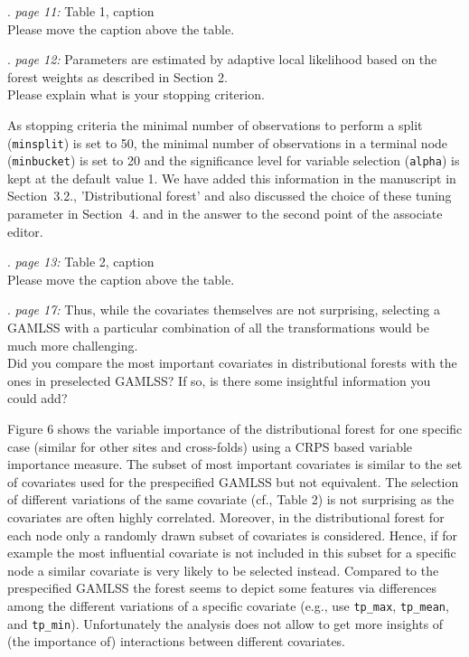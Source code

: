 \documentclass[american,foldmarks=false,noconfig]{uibklttr}
\let\code=\texttt
\newenvironment{review}{\fontshape{\itdefault}\fontseries{\bfdefault} \selectfont \smallskip}{\par}
\begin{document}
\begin{review}
12. {\color{quotecolor}\textit{page 11:} Table 1, caption}\\
Please move the caption above the table.
\end{review}


\begin{review}
13. {\color{quotecolor}\textit{page 12:} Parameters are estimated 
by adaptive local likelihood based on the forest weights as 
described in Section 2.}\\
Please explain what is your stopping criterion.
\end{review}

As stopping criteria the minimal number of observations to perform 
a split (\texttt{minsplit}) is set to 50, the minimal number of 
observations in a terminal node (\texttt{minbucket}) is set to 20 
and the significance level for variable selection (\texttt{alpha}) 
is kept at the default value 1. We have added this information in 
the manuscript in Section~3.2., 'Distributional forest' and
also discussed the choice of these tuning parameter in Section~4. and
in the answer to the second point of the associate editor.


\begin{review}
14. {\color{quotecolor}\textit{page 13:} Table 2, caption}\\
Please move the caption above the table.
\end{review}


\begin{review}
15. {\color{quotecolor}\textit{page 17:} Thus, while the covariates 
themselves are not surprising, selecting a GAMLSS with a particular 
combination of all the transformations would be much more challenging.}\\
Did you compare the most important covariates in distributional forests
with the ones in preselected GAMLSS? If so, is there some insightful
information you could add?
\end{review}

Figure 6 shows the variable importance of the distributional forest
for one specific case (similar for other sites and cross-folds) 
using a CRPS based variable importance measure. The subset of 
most important covariates is similar to the set of covariates 
used for the prespecified GAMLSS but not equivalent.
The selection of different variations of the same covariate (cf., Table 2)
is not surprising as the covariates are often highly correlated.
Moreover, in the distributional forest for each node only a randomly
drawn subset of covariates is considered. Hence, if for example the most 
influential covariate is not included in this subset for a specific node 
a similar covariate is very likely to be selected instead.
Compared to the prespecified GAMLSS the forest seems to depict some
features via differences among the different variations of a specific
covariate (e.g., use \code{tp\_max}, \code{tp\_mean}, and \code{tp\_min}).
Unfortunately the analysis does not allow to get more insights
of (the importance of) interactions between different covariates.
\end{document}
